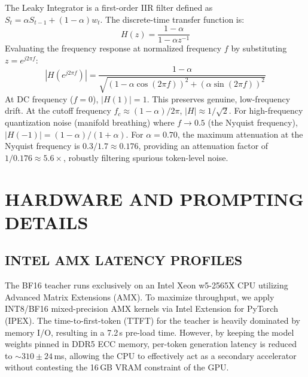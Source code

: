 \documentclass{ieeetmlcn}
\begin{document}
The Leaky Integrator is a first-order IIR filter defined as $S_t = \alpha S_{t-1} + (1-\alpha)w_t$. The discrete-time transfer function is:
\begin{equation}
H(z) = \frac{1-\alpha}{1 - \alpha z^{-1}}
\end{equation}
Evaluating the frequency response at normalized frequency $f$ by substituting $z = e^{j2\pi f}$:
\begin{equation}
|H(e^{j2\pi f})| = \frac{1-\alpha}{\sqrt{(1-\alpha\cos(2\pi f))^2 + (\alpha\sin(2\pi f))^2}}
\end{equation}
At DC frequency ($f=0$), $|H(1)| = 1$. This preserves genuine, low-frequency drift. At the cutoff frequency $f_c \approx (1-\alpha)/2\pi$, $|H| \approx 1/\sqrt{2}$. For high-frequency quantization noise (manifold breathing) where $f \to 0.5$ (the Nyquist frequency), $|H(-1)| = (1-\alpha)/(1+\alpha)$. 
For $\alpha=0.70$, the maximum attenuation at the Nyquist frequency is $0.3 / 1.7 \approx 0.176$, providing an attenuation factor of $1/0.176 \approx 5.6\times$, robustly filtering spurious token-level noise.

\section{HARDWARE AND PROMPTING DETAILS}
\label{app:hardware}
\subsection{INTEL AMX LATENCY PROFILES}
The BF16 teacher runs exclusively on an Intel Xeon w5-2565X CPU utilizing Advanced Matrix Extensions (AMX). To maximize throughput, we apply INT8/BF16 mixed-precision AMX kernels via Intel Extension for PyTorch (IPEX). The time-to-first-token (TTFT) for the teacher is heavily dominated by memory I/O, resulting in a 7.2\,s pre-load time. However, by keeping the model weights pinned in DDR5 ECC memory, per-token generation latency is reduced to $\sim\!310\pm24$\,ms, allowing the CPU to effectively act as a secondary accelerator without contesting the 16\,GB VRAM constraint of the GPU.
\end{document}
